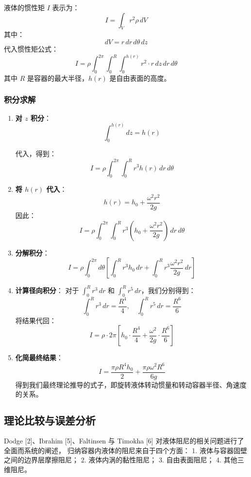 \documentclass[12pt,hyperref,a4paper,UTF8]{ctexart}
\begin{document}
\begin{itemize}
        液体的惯性矩 $I$ 表示为：  
        $$
        I = \int_V r^2 \rho \, dV
        $$  
        其中：  
        $$
        dV = r \, dr \, d\theta \, dz
        $$  
        代入惯性矩公式：  
        $$
        I = \rho \int_0^{2\pi} \int_0^{R} \int_0^{h(r)} r^2 \cdot r \, dz \, dr \, d\theta
        $$  
        其中 $R$ 是容器的最大半径，$h(r)$ 是自由表面的高度。
        
        \subsubsection{积分求解}
        \begin{enumerate}
        \item \textbf{对 $z$ 积分}：  
        $$
        \int_0^{h(r)} dz = h(r)
        $$  
        
        代入，得到：  
        $$
        I = \rho \int_0^{2\pi} \int_0^{R} r^3 h(r) \, dr \, d\theta
        $$  
        
        \item \textbf{将 $h(r)$ 代入}：  
        $$
        h(r) = h_0 + \frac{\omega^2 r^2}{2g}
        $$  
        因此：  
        $$
        I = \rho \int_0^{2\pi} \int_0^{R} r^3 \left( h_0 + \frac{\omega^2 r^2}{2g} \right) \, dr \, d\theta
        $$  
        
        \item \textbf{分解积分}：  
        $$
        I = \rho \int_0^{2\pi} d\theta \left[ \int_0^{R} r^3 h_0 \, dr + \int_0^{R} r^3 \frac{\omega^2 r^2}{2g} \, dr \right]
        $$  
        
        \item \textbf{计算径向积分}：  
        对于 $\int_0^R r^3 \, dr$ 和 $\int_0^R r^5 \, dr$，我们分别得到：  
        $$
        \int_0^R r^3 \, dr = \frac{R^4}{4}, \quad \int_0^R r^5 \, dr = \frac{R^6}{6}
        $$  
        将结果代回：  
        $$
        I = \rho \cdot 2\pi \left[ h_0 \cdot \frac{R^4}{4} + \frac{\omega^2}{2g} \cdot \frac{R^6}{6} \right]
        $$  
        
        \item \textbf{化简最终结果}：  
        $$
        I = \frac{\pi \rho R^4 h_0}{2} + \frac{\pi \rho \omega^2 R^6}{6g}
        $$  
        得到我们最终理论推导的式子，即旋转液体转动惯量和转动容器半径、角速度的关系。
        \end{enumerate}

        \subsection{理论比较与误差分析}
        Dodge [2]、Ibrahim [5]、Faltinsen 与 Timokha [6] 对液体阻尼的相关问题进行了全面而系统的阐述，  
        归纳容器内液体的阻尼来自于四个方面：
        1. 液体与容器固壁之间的边界层摩擦阻尼；
        2. 液体内涡的黏性阻尼；
        3. 自由表面阻尼；
        4. 其他三维阻尼。
        

\end{itemize}
\end{document}
